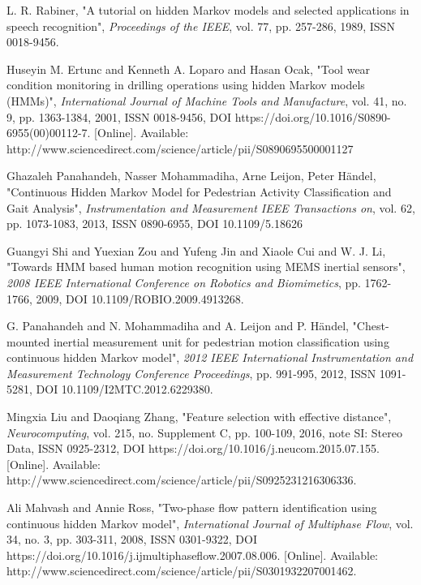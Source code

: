 

\begin{thebibliography}{5}
	
 L. R. Rabiner, "A tutorial on hidden Markov models and selected applications in speech recognition", \emph{Proceedings of the IEEE}, vol. 77, pp. 257-286, 1989, ISSN 0018-9456.

 Huseyin M. Ertunc and Kenneth A. Loparo and Hasan Ocak, "Tool wear condition monitoring in drilling operations using hidden Markov models (HMMs)", \emph{International Journal of Machine Tools and Manufacture}, vol. 41, no. 9, pp. 1363-1384, 2001, ISSN 0018-9456, DOI https://doi.org/10.1016/S0890-6955(00)00112-7. [Online]. Available:  http://www.sciencedirect.com/science/article/pii/S0890695500001127

 Ghazaleh Panahandeh, Nasser Mohammadiha, Arne Leijon, Peter Händel, "Continuous Hidden Markov Model for Pedestrian Activity Classification and Gait Analysis", \emph{Instrumentation and Measurement IEEE Transactions on}, vol. 62, pp. 1073-1083, 2013, ISSN 0890-6955, DOI 10.1109/5.18626

 Guangyi Shi and Yuexian Zou and Yufeng Jin and Xiaole Cui and W. J. Li, "Towards HMM based human motion recognition using MEMS inertial sensors", \emph{2008 IEEE International Conference on Robotics and Biomimetics}, pp. 1762-1766, 2009, DOI 10.1109/ROBIO.2009.4913268.

 G. Panahandeh and N. Mohammadiha and A. Leijon and P. Händel, "Chest-mounted inertial measurement unit for pedestrian motion classification using continuous hidden Markov model", \emph{2012 IEEE International Instrumentation and Measurement Technology Conference Proceedings}, pp. 991-995, 2012, ISSN 1091-5281, DOI 10.1109/I2MTC.2012.6229380.

 Mingxia Liu and Daoqiang Zhang, "Feature selection with effective distance", \emph{Neurocomputing}, vol. 215, no. Supplement C, pp. 100-109, 2016, note SI: Stereo Data, ISSN 0925-2312, DOI https://doi.org/10.1016/j.neucom.2015.07.155. [Online]. Available: http://www.sciencedirect.com/science/article/pii/S0925231216306336. 

 Ali Mahvash and Annie Ross, "Two-phase flow pattern identification using continuous hidden Markov model", \emph{International Journal of Multiphase Flow}, vol. 34, no. 3, pp. 303-311, 2008, ISSN 0301-9322, DOI https://doi.org/10.1016/j.ijmultiphaseflow.2007.08.006. [Online]. Available: http://www.sciencedirect.com/science/article/pii/S0301932207001462. 


\end{thebibliography}
